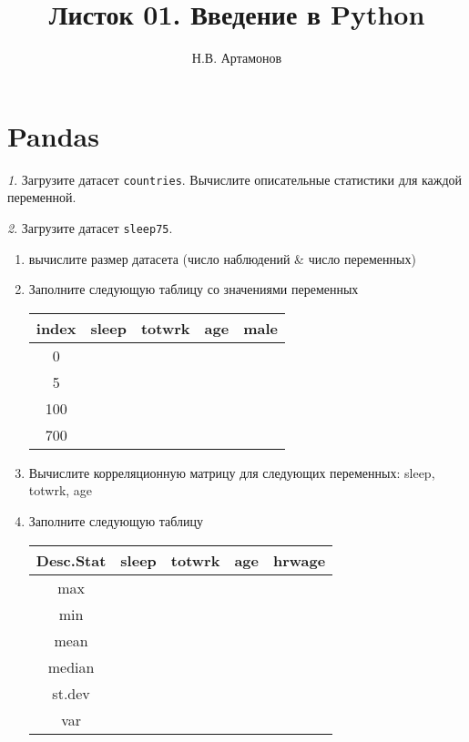 \documentclass[12pt]{article}
\title{Листок 01. Введение в Python}
\author{Н.В. Артамонов}
\theoremstyle{remark}
\newtheorem{exercise}{}[section]
\begin{document}
\maketitle

\tableofcontents

\section{Pandas}

\begin{exercise}
Загрузите датасет \texttt{countries}. Вычислите описательные статистики 
для каждой переменной.
\end{exercise}

\begin{exercise}
Загрузите датасет \texttt{sleep75}.
\begin{enumerate}
	\item вычислите размер датасета (число наблюдений \& число переменных)
	\item Заполните следующую таблицу со значениями переменных
	\begin{center}
		\begin{tabular}{|c|c|c|c|c|} \hline
			index & sleep & totwrk & age & male\\ \hline\hline
			0 & & & & \\ \hline
			5 & & & & \\ \hline
			100 & & & & \\ \hline
			700 & & & & \\ \hline
		\end{tabular}
	\end{center}
	\item Вычислите корреляционную матрицу для следующих переменных: sleep, totwrk, age 
	\item Заполните следующую таблицу
	\begin{center}
		\begin{tabular}{|c|c|c|c|c|} \hline
			Desc.Stat & sleep & totwrk & age & hrwage\\ \hline\hline
			max & & & & \\ \hline
			min & & & & \\ \hline
			mean & & & & \\ \hline
			median & & & & \\ \hline
			st.dev & & & & \\ \hline
			var & & & & \\ \hline

\end{tabular}
\end{center}
\end{enumerate}
\end{exercise}
\end{document}
